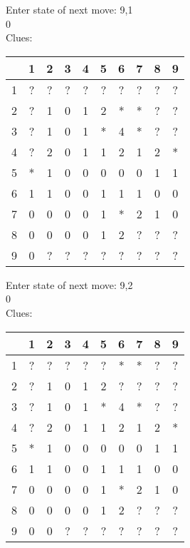 Enter state of next move: 9,1\\
0\\
Clues:\\
\begin{tabular}{|c|c|c|c|c|c|c|c|c|c|}
\hline
  & 1 & 2 & 3 & 4 & 5 & 6 & 7 & 8 & 9\\
\hline
1 & ? & ? & ? & ? & ? & ? & ? & ? & ?\\
\hline
2 & ? & 1 & 0 & 1 & 2 & * & * & ? & ?\\
\hline
3 & ? & 1 & 0 & 1 & * & 4 & * & ? & ?\\
\hline
4 & ? & 2 & 0 & 1 & 1 & 2 & 1 & 2 & *\\
\hline
5 & * & 1 & 0 & 0 & 0 & 0 & 0 & 1 & 1\\
\hline
6 & 1 & 1 & 0 & 0 & 1 & 1 & 1 & 0 & 0\\
\hline
7 & 0 & 0 & 0 & 0 & 1 & * & 2 & 1 & 0\\
\hline
8 & 0 & 0 & 0 & 0 & 1 & 2 & ? & ? & ?\\
\hline
9 & 0 & ? & ? & ? & ? & ? & ? & ? & ?\\
\hline
\end{tabular}

Enter state of next move: 9,2\\
0\\
Clues:\\
\begin{tabular}{|c|c|c|c|c|c|c|c|c|c|}
\hline
  & 1 & 2 & 3 & 4 & 5 & 6 & 7 & 8 & 9\\
\hline
1 & ? & ? & ? & ? & ? & * & * & ? & ?\\
\hline
2 & ? & 1 & 0 & 1 & 2 & ? & ? & ? & ?\\
\hline
3 & ? & 1 & 0 & 1 & * & 4 & * & ? & ?\\
\hline
4 & ? & 2 & 0 & 1 & 1 & 2 & 1 & 2 & *\\
\hline
5 & * & 1 & 0 & 0 & 0 & 0 & 0 & 1 & 1\\
\hline
6 & 1 & 1 & 0 & 0 & 1 & 1 & 1 & 0 & 0\\
\hline
7 & 0 & 0 & 0 & 0 & 1 & * & 2 & 1 & 0\\
\hline
8 & 0 & 0 & 0 & 0 & 1 & 2 & ? & ? & ?\\
\hline
9 & 0 & 0 & ? & ? & ? & ? & ? & ? & ?\\
\hline
\end{tabular}


